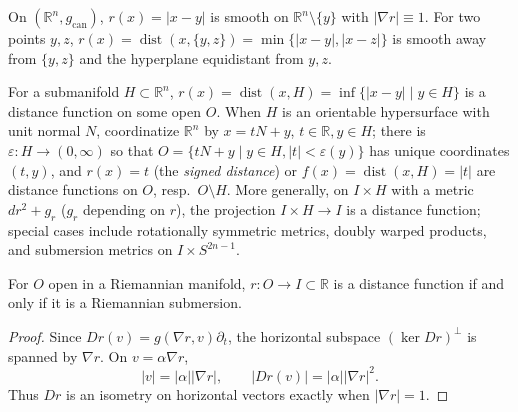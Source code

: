 \begin{example}
  \label{ex:pet-ch3-distance-to-points}
  \leanok
  On $(\mathbb R^n,g_{\mathrm{can}})$, $r(x)=|x-y|$ is smooth on $\mathbb
  R^n\setminus\{y\}$ with $|\nabla r|\equiv1$. For two points $y,z$,
  $r(x)=\operatorname{dist}(x,\{y,z\})=\min\{|x-y|,|x-z|\}$ is smooth away from
  $\{y,z\}$ and the
  hyperplane equidistant from $y,z$.
\end{example}

\begin{example}
  \label{ex:pet-ch3-distance-to-submanifold}
  \leanok
  For a submanifold $H\subset\mathbb R^n$,
  $r(x)=\operatorname{dist}(x,H)=\inf\{|x-y|\mid y\in H\}$ is a distance function
  on some open $O$. When $H$ is an orientable hypersurface
  with unit normal $N$, coordinatize $\mathbb R^n$ by $x=tN+y$, $t\in\mathbb
  R,y\in H$; there is $\varepsilon:H\to(0,\infty)$ so that
  $O=\{tN+y\mid y\in H,|t|<\varepsilon(y)\}$ has unique coordinates $(t,y)$, and
  $r(x)=t$ (the \emph{signed distance}) or
  $f(x)=\operatorname{dist}(x,H)=|t|$ are distance functions on $O$, resp.\
  $O\setminus H$. More generally, on $I\times H$ with a metric
  $dr^2+g_r$ ($g_r$ depending on $r$), the projection $I\times H\to I$ is a
  distance function; special cases include rotationally symmetric metrics,
  doubly warped products, and submersion metrics on $I\times S^{2n-1}$.
\end{example}

\begin{lemma}
  \label{lem:pet-ch3-distance-function-submersion}
  \leanok
  For $O$ open in a Riemannian manifold, $r:O\to I\subset\mathbb R$ is a distance
  function if and only if it is a Riemannian submersion.
\end{lemma}
\begin{proof}
  \leanok
  \sketch
  Since
  $Dr(v)=g(\nabla r,v)\partial_t$, the horizontal subspace
  $(\ker Dr)^\perp$ is spanned by $\nabla r$. On $v=\alpha\nabla r$,
  \[
   |v|=|\alpha||\nabla r|,\qquad |Dr(v)|=|\alpha||\nabla r|^2.
  \]
  Thus $Dr$ is an isometry on horizontal vectors exactly when $|\nabla r|=1$.
\end{proof}

